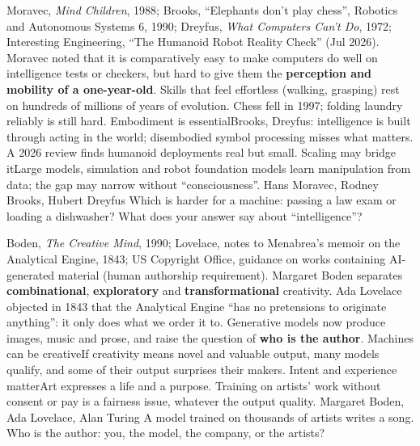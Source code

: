{Moravec, \emph{Mind Children}, 1988; Brooks, ``Elephants don't play chess'', Robotics and Autonomous Systems 6, 1990; Dreyfus, \emph{What Computers Can't Do}, 1972; Interesting Engineering, ``The Humanoid Robot Reality Check'' (Jul 2026).}
{Moravec noted that it is comparatively easy to make computers do well on intelligence tests or checkers, but hard to give them the \textbf{perception and mobility of a one-year-old}. Skills that feel effortless (walking, grasping) rest on hundreds of millions of years of evolution. Chess fell in 1997; folding laundry reliably is still hard.}
{Embodiment is essential}{Brooks, Dreyfus: intelligence is built through acting in the world; disembodied symbol processing misses what matters. A 2026 review finds humanoid deployments real but small.}
{Scaling may bridge it}{Large models, simulation and robot foundation models learn manipulation from data; the gap may narrow without ``consciousness''.}
{Hans Moravec, Rodney Brooks, Hubert Dreyfus}
{Which is harder for a machine: passing a law exam or loading a dishwasher? What does your answer say about ``intelligence''?}

{Boden, \emph{The Creative Mind}, 1990; Lovelace, notes to Menabrea's memoir on the Analytical Engine, 1843; US Copyright Office, guidance on works containing AI-generated material (human authorship requirement).}
{Margaret Boden separates \textbf{combinational}, \textbf{exploratory} and \textbf{transformational} creativity. Ada Lovelace objected in 1843 that the Analytical Engine ``has no pretensions to originate anything'': it only does what we order it to. Generative models now produce images, music and prose, and raise the question of \textbf{who is the author}.}
{Machines can be creative}{If creativity means novel and valuable output, many models qualify, and some of their output surprises their makers.}
{Intent and experience matter}{Art expresses a life and a purpose. Training on artists' work without consent or pay is a fairness issue, whatever the output quality.}
{Margaret Boden, Ada Lovelace, Alan Turing}
{A model trained on thousands of artists writes a song. Who is the author: you, the model, the company, or the artists?}

